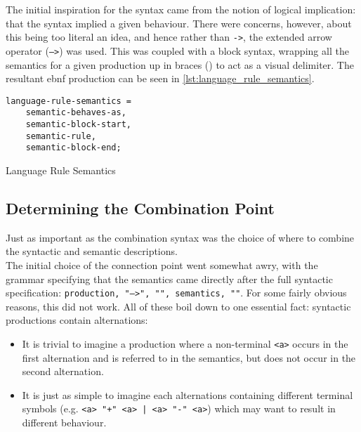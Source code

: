 The initial inspiration for the syntax came from the notion of logical implication: that the syntax implied a given behaviour. 
There were concerns, however, about this being too literal an idea, and hence rather than \texttt{->}, the extended arrow operator (\texttt{-->}) was used. 
This was coupled with a block syntax, wrapping all the semantics for a given production up in braces (\texttt{{}}) to act as a visual delimiter.
The resultant \gls{ebnf} production can be seen in \autoref{lst:language_rule_semantics}. 

\begin{listing}[!htb]
\begin{verbatim}
language-rule-semantics = 
    semantic-behaves-as,
    semantic-block-start,
    semantic-rule,
    semantic-block-end;
\end{verbatim}
\caption{Language Rule Semantics}
\label{lst:language_rule_semantics}
\end{listing}


\subsection{Determining the Combination Point} %
\label{sub:determining_the_combination_point}
Just as important as the combination syntax was the choice of where to combine the syntactic and semantic descriptions.\\

The initial choice of the connection point went somewhat awry, with the grammar specifying that the semantics came directly after the full syntactic specification: \texttt{production, "-->", "{", semantics, "}"}.
For some fairly obvious reasons, this did not work.
All of these boil down to one essential fact: syntactic productions contain alternations:
\begin{itemize}
    \item It is trivial to imagine a production where a non-terminal \texttt{<a>} occurs in the first alternation and is referred to in the semantics, but does not occur in the second alternation. 
    \item It is just as simple to imagine each alternations containing different terminal symbols (e.g. \texttt{<a> "+" <a> | <a> "-" <a>}) which may want to result in different behaviour. 
\end{itemize}


